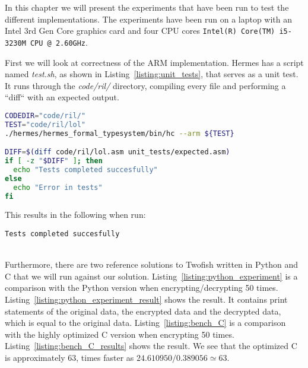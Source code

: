 In this chapter we will present the experiments that have been run to test the different implementations.
The experiments have been run on a laptop with an Intel 3rd Gen Core graphics card and four CPU cores \lstinline{Intel(R) Core(TM) i5-3230M CPU @ 2.60GHz}.

First we will look at correctness of the ARM implementation.
Hermes has a script named \emph{test.sh}, as shown in Listing~\ref{listing:unit_tests}, that serves as a unit test. It runs through the \emph{code/ril/} directory, compiling every file and performing a ``diff`` with an expected output.

\begin{lstlisting}[label=listing:unit_tests, caption=Unit testing of the compiler is performed by a bash script., language=bash, float=htp]
CODEDIR="code/ril/"
TEST="code/ril/lol"
./hermes/hermes_formal_typesystem/bin/hc --arm ${TEST}

DIFF=$(diff code/ril/lol.asm unit_tests/expected.asm)
if [ -z "$DIFF" ]; then
  echo "Tests completed succesfully"
else
  echo "Error in tests"
fi
\end{lstlisting}
This results in the following when run:
\begin{lstlisting}[float=htp]
Tests completed succesfully
\end{lstlisting} \\
Furthermore, there are two reference solutions to Twofish written in Python and C that we will run against our solution.
Listing~\ref{listing:python_experiment} is a comparison with the Python version when encrypting/decrypting 50 times.
Listing~\ref{listing:python_experiment_result} shows the result. It contains print statements of the original data, the encrypted data and the decrypted data, which is equal to the original data.
Listing~\ref{listing:bench_C} is a comparison with the highly optimized C version when encrypting 50 times.
Listing~\ref{listing:bench_C_results} shows the result. We see that the optimized C is approximately 63, times faster as $24.610950 / 0.389056 \simeq 63$.

